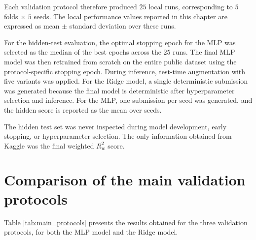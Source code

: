 Each validation protocol therefore produced $25$ local runs, corresponding to $5$ folds $\times$ $5$ seeds. The local performance values reported in this chapter are expressed as mean $\pm$ standard deviation over these runs.

For the hidden-test evaluation, the optimal stopping epoch for the MLP was selected as the median of the best epochs across the $25$ runs. The final MLP model was then retrained from scratch on the entire public dataset using the protocol-specific stopping epoch. During inference, test-time augmentation with five variants was applied. For the Ridge model, a single deterministic submission was generated because the final model is deterministic after hyperparameter selection and inference. For the MLP, one submission per seed was generated, and the hidden score is reported as the mean over seeds.

The hidden test set was never inspected during model development, early stopping, or hyperparameter selection. The only information obtained from Kaggle was the final weighted $R^2_w$ score.

\section{Comparison of the main validation protocols}

Table \ref{tab:main_protocols} presents the results obtained for the three validation protocols, for both the MLP model and the Ridge model.

